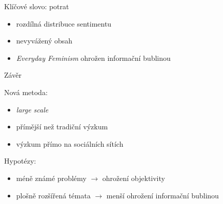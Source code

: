 \documentclass[notheorems,12pt]{beamer}
\begin{document}
\begin{frame}{Klíčové slovo: potrat}
    \vspace{-0.6cm}
    \begin{itemize}
    	\item rozdílná distribuce sentimentu
        \item nevyvážený obsah
    	\item \textit{Everyday Feminism} ohrožen informační bublinou
    \end{itemize}
\end{frame}
\begin{frame}{Závěr}
    \begin{block}{Nová metoda:}
        \begin{itemize}
            \item \textit{large scale}
            \item přímější než tradiční výzkum
            \item výzkum přímo na sociálních sítích
        \end{itemize}
    \end{block}

    \begin{block}{Hypotézy:}
    	\begin{itemize}
            \item méně známé problémy $\rightarrow$ ohrožení objektivity
            \item plošně rozšířená témata $\rightarrow$  menší ohrožení informační bublinou
    	\end{itemize}
    \end{block}
\end{frame}
\end{document}
